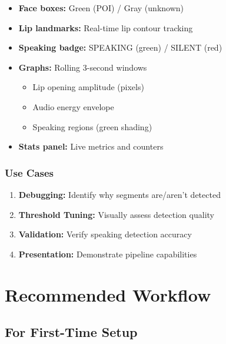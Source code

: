 \documentclass[11pt,a4paper]{article}
\begin{document}
\begin{itemize}
    \item \textbf{Face boxes:} Green (POI) / Gray (unknown)
    \item \textbf{Lip landmarks:} Real-time lip contour tracking
    \item \textbf{Speaking badge:} SPEAKING (green) / SILENT (red)
    \item \textbf{Graphs:} Rolling 3-second windows
    \begin{itemize}
        \item Lip opening amplitude (pixels)
        \item Audio energy envelope
        \item Speaking regions (green shading)
    \end{itemize}
    \item \textbf{Stats panel:} Live metrics and counters
\end{itemize}

\subsubsection{Use Cases}

\begin{enumerate}
    \item \textbf{Debugging:} Identify why segments are/aren't detected
    \item \textbf{Threshold Tuning:} Visually assess detection quality
    \item \textbf{Validation:} Verify speaking detection accuracy
    \item \textbf{Presentation:} Demonstrate pipeline capabilities
\end{enumerate}

\section{Recommended Workflow}

\subsection{For First-Time Setup}
\end{document}
